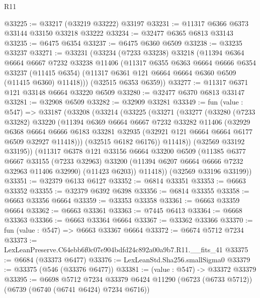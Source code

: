 \begin{lexlean}{R11}
\begin{coremodule}
@33225 := @33217 (@33219 @33222) @33197
@33231 := @11317 @6366 @6373 @33144 @33150 @33218 @33222
@33234 := @32477 @6365 @6813 @33143
@33235 := @6475 @6354
@33237 := @6475 @6360 @6509
@33238 := @33235 @33237
@33271 := @33231
    (@33234
      (@7233 @33238)
      @33218
      (@11394
        @6364
        @6664
        @6667
        @7232
        @33238
        @11406
        (@11317
          @6355
          @6363
          @6664
          @6666
          @6354
          @33237
          (@11415 @6354)
          (@11317 @6361 @121 @6664 @6664 @6360 @6509 (@11415 @6360) @11418)))
      (@32515 @6353 @6359))
@33277 := @11317 @6371 @121 @33148 @6664 @33220 @6509
@33280 := @32477 @6370 @6813 @33147
@33281 := @32908 @6509
@33282 := @32909 @33281
@33349 := fun (value : @547) =>
  @33187
    (@33208
      (@33214
        (@33225
          (@33271
            (@33277
              (@33280
                (@7233 @33282)
                @33220
                (@11394
                  @6369
                  @6664
                  @6667
                  @7232
                  @33282
                  @11406
                  (@32929
                    @6368
                    @6664
                    @6666
                    @6183
                    @33281
                    @32935
                    (@32921 @121 @6664 @6664 @6177 @6509 @32927 @11418)))
                (@32515 @6182 @6176))
              @11418))
          (@32569 @33192 @33195))
        (@11317
          @6378
          @121
          @33156
          @6664
          @33200
          @6509
          (@11385
            @6377
            @6667
            @33155
            (@7233 @32963)
            @33200
            (@11394 @6207 @6664 @6666 @7232 @32963 @11406 @32990)
            (@11423 @6203))
          @11418))
      (@32569 @33196 @33199))
@33351 := @32379 @6133 @6127
@33352 := @6814 @33351
@33353 := @6663 @33352
@33355 := @32379 @6392 @6398
@33356 := @6814 @33355
@33358 := @6663 @33356 @6664
@33359 := @33353 @33358
@33361 := @6663 @33359 @6664
@33362 := @6663 @33361
@33363 := @7445 @6413
@33364 := @6668 @33363
@33366 := @6663 @33364 @6664
@33367 := @33362 @33366
@33370 := fun (value : @547) => @6663 @33367 @6664
@33372 := @6674 @5712 @7234
@33373 := LexLeanPreserve.C64ebb6f0c07e904bdfd24c892a00a9b7.R11.__fits_41
@33375 := @6684 (@33373 @6477)
@33376 := LexLeanStd.Sha256.smallSigma0
@33379 := @33375 (@546 (@33376 @6477))
@33381 := (value : @547) -> @33372 @33379
@33395 := @6698
    @5712
    @7234
    @33379
    @6424
    @11290
    (@6723 (@6733 @5712))
    (@6739 (@6740 (@6741 @6424) @7234 @6716))

\end{coremodule}
\end{lexlean}
